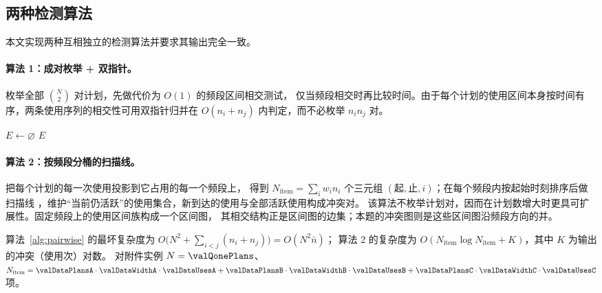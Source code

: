 \subsection{两种检测算法}
\label{sec:q1alg}

本文实现两种互相独立的检测算法并要求其输出完全一致。

\paragraph{算法 1：成对枚举 + 双指针。}枚举全部 $\binom{N}{2}$ 对计划，先做代价为 $O(1)$ 的频段区间相交测试，
仅当频段相交时再比较时间。由于每个计划的使用区间本身按时间有序，两条使用序列的相交性可用双指针归并在
$O(n_i+n_j)$ 内判定，而不必枚举 $n_i n_j$ 对。

\begin{algorithm}[H]
\caption{成对枚举检测（双指针归并）}\label{alg:pairwise}
$E\leftarrow\varnothing$\;
\Return $E$\;
\end{algorithm}

\paragraph{算法 2：按频段分桶的扫描线。}把每个计划的每一次使用投影到它占用的每一个频段上，
得到 $N_{\text{item}}=\sum_i w_i n_i$ 个三元组 $(\text{起}, \text{止}, i)$；在每个频段内按起始时刻排序后做扫描线
\cite{debergh2008,cormen2009}，维护“当前仍活跃”的使用集合，新到达的使用与全部活跃使用构成冲突对。
该算法不枚举计划对，因而在计划数增大时更具可扩展性。固定频段上的使用区间族构成一个区间图，
其相交结构正是区间图的边集\cite{golumbic2004}；本题的冲突图则是这些区间图沿频段方向的并。

\begin{proposition}[检测复杂度]\label{prop:complexity}
算法~\ref{alg:pairwise} 的最坏复杂度为 $O\bigl(N^2+\sum_{i<j}(n_i+n_j)\bigr)=O(N^2\bar n)$；
算法 2 的复杂度为 $O(N_{\text{item}}\log N_{\text{item}}+K)$，其中 $K$ 为输出的冲突（使用次）对数。
对附件实例 $N=\valQonePlans$、$N_{\text{item}}=\valDataPlansA\cdot\valDataWidthA\cdot\valDataUsesA
+\valDataPlansB\cdot\valDataWidthB\cdot\valDataUsesB+\valDataPlansC\cdot\valDataWidthC\cdot\valDataUsesC$ 项。
\end{proposition}

